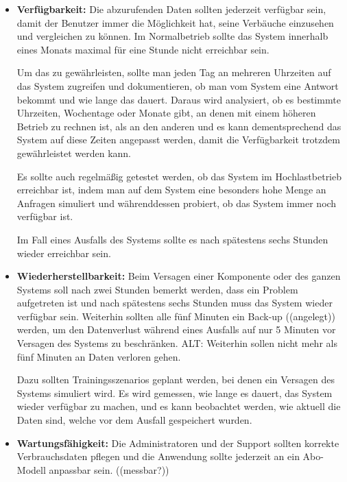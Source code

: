 
\begin{itemize}
    \item \textbf{Verfügbarkeit: }
    Die abzurufenden Daten sollten jederzeit verfügbar sein,
    damit der Benutzer immer die Möglichkeit hat, 
    seine Verbäuche einzusehen und vergleichen zu können.
    Im Normalbetrieb sollte das System innerhalb eines Monats maximal für eine Stunde nicht erreichbar sein.
    
    Um das zu gewährleisten, sollte man jeden Tag an mehreren Uhrzeiten auf das System zugreifen
    und dokumentieren, ob man vom System eine Antwort bekommt und wie lange das dauert. 
    Daraus wird analysiert, ob es bestimmte Uhrzeiten, Wochentage oder Monate gibt, 
    an denen mit einem höheren Betrieb zu rechnen ist, als an den anderen und es kann dementsprechend das
    System auf diese Zeiten angepasst werden, damit die Verfügbarkeit trotzdem gewährleistet werden kann. 
   
    Es sollte auch regelmäßig getestet werden, ob das System im Hochlastbetrieb erreichbar ist, 
    indem man auf dem System eine besonders hohe Menge an Anfragen simuliert und währenddessen probiert,
    ob das System immer noch verfügbar ist. 
    
    Im Fall eines Ausfalls des Systems sollte es nach spätestens sechs Stunden wieder erreichbar sein.

    \item \textbf{Wiederherstellbarkeit: }
    Beim Versagen einer Komponente oder des ganzen Systems soll nach zwei Stunden bemerkt werden, 
    dass ein Problem aufgetreten ist und nach spätestens sechs Stunden muss das System wieder verfügbar sein.
    Weiterhin sollten alle fünf Minuten ein Back-up ((angelegt)) werden, um den Datenverlust während eines Ausfalls
    auf nur 5 Minuten vor Versagen des Systems zu beschränken. 
    ALT: Weiterhin sollen nicht mehr als fünf Minuten an Daten verloren gehen.
    
    Dazu sollten Trainingsszenarios geplant werden, bei denen ein Versagen des Systems simuliert wird. 
    Es wird gemessen, wie lange es dauert, das System wieder verfügbar zu machen, und es kann beobachtet werden,
    wie aktuell die Daten sind, welche vor dem Ausfall gespeichert wurden. 
    
  
    \item \textbf{Wartungsfähigkeit: }
    Die Administratoren und der Support sollten korrekte Verbrauchsdaten 
    pflegen und die Anwendung sollte jederzeit an ein Abo-Modell anpassbar sein.
    ((messbar?))
    

\end{itemize}
